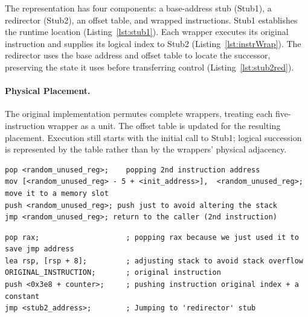 \documentclass[runningheads]{llncs}
\begin{document}
The representation has four components: a base-address stub (Stub1), a
redirector (Stub2), an offset table, and wrapped instructions.
Stub1 establishes the runtime location (Listing~\ref{lst:stub1}).
Each wrapper executes its original instruction and supplies its logical
index to Stub2 (Listing~\ref{lst:instrWrap}). The redirector uses the base
address and offset table to locate the successor, preserving the state
it uses before transferring control (Listing~\ref{lst:stub2red}).

\paragraph{Physical Placement.}
The original implementation permutes complete wrappers, treating each five-instruction wrapper as a unit. The offset table is updated for the resulting placement. Execution still starts with the initial call to Stub1; logical succession is represented by the table rather than by the wrappers' physical adjacency.

\begin{lstlisting}[label={lst:stub1},language={[x86masm]Assembler}, basicstyle=\scriptsize\ttfamily, caption={Base-address component. Reproduced from Listing~1 of~\cite{zone_secrypt_2026}.}]
pop <random_unused_reg>;    popping 2nd instruction address
mov [<random_unused_reg> - 5 + <init_address>],  <random_unused_reg>; move it to a memory slot
push <random_unused_reg>; push just to avoid altering the stack
jmp <random_unused_reg>; return to the caller (2nd instruction)
\end{lstlisting}

\begin{lstlisting}[label={lst:instrWrap}, language={[x86masm]Assembler}, basicstyle=\scriptsize\ttfamily, caption={Instruction wrapper. Reproduced from Listing~2 of~\cite{zone_secrypt_2026}.}]
pop rax;                    ; popping rax because we just used it to save jmp address
lea rsp, [rsp + 8];         ; adjusting stack to avoid stack overflow
ORIGINAL_INSTRUCTION;       ; original instruction
push <0x3e8 + counter>;     ; pushing instruction original index + a constant
jmp <stub2_address>;        ; Jumping to 'redirector' stub 
\end{lstlisting}
\end{document}
